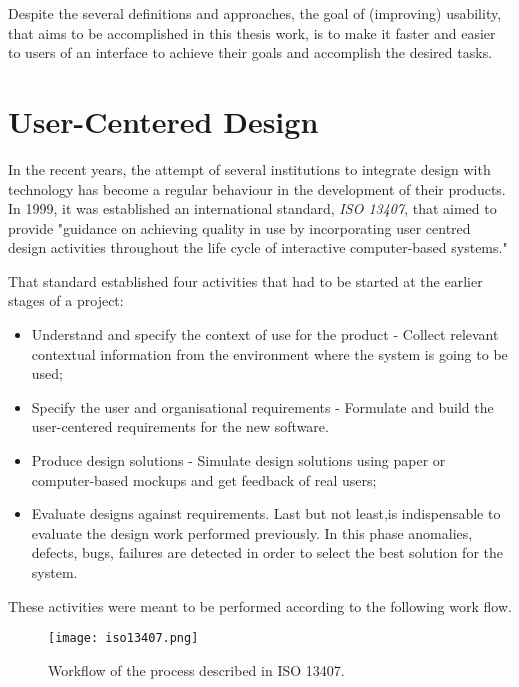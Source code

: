 Despite the several definitions and approaches, the goal of  (improving) usability, that aims to be accomplished in this thesis work, is to make it faster and easier to users of an interface to achieve their goals and accomplish the desired tasks.


\section{User-Centered Design}

In the recent years, the attempt of several institutions to integrate design with technology has become a regular behaviour in the development of their products.
In 1999, it was established an international standard, \emph{ISO 13407}, that aimed to provide "guidance on achieving quality in use by incorporating user centred design activities throughout the life cycle of interactive computer-based systems."

That standard established four activities that had to be started at the earlier stages of a project:

\begin{itemize}
\item Understand and specify the context of use for the product - Collect relevant contextual information from the environment where the system is going to be used;
\item Specify the user and organisational requirements - Formulate and build the user-centered
requirements for the new software.
\item Produce design solutions - Simulate design solutions using paper or computer-based mockups and get feedback of real users;
\item Evaluate designs against requirements. Last but not least,is indispensable to evaluate
the design work performed previously. In this phase anomalies, defects, bugs, failures are detected in order to select the best solution for the system.
\end{itemize}

These activities were meant to be performed according to the following work flow.

\begin{figure}[h!]
  \begin{center}
    \leavevmode
    \texttt{[image: iso13407.png]}
    \caption{Workflow of the process described in ISO 13407.}
    \label{fig:iso}
  \end{center}
\end{figure}

